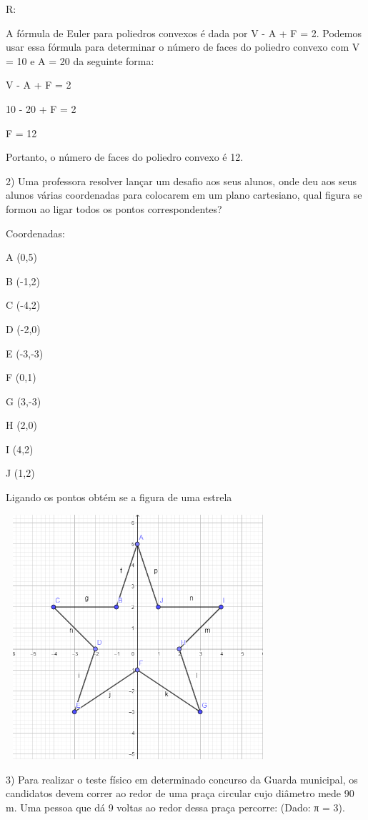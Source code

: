 R:

A fórmula de Euler para poliedros convexos é dada por V - A + F = 2.
Podemos usar essa fórmula para determinar o número de faces do poliedro
convexo com V = 10 e A = 20 da seguinte forma:

V - A + F = 2

10 - 20 + F = 2

F = 12

Portanto, o número de faces do poliedro convexo é 12.

2) Uma professora resolver lançar um desafio aos seus alunos, onde deu
aos seus alunos várias coordenadas para colocarem em um plano
cartesiano, qual figura se formou ao ligar todos os pontos
correspondentes?

Coordenadas:

A (0,5)

B (-1,2)

C (-4,2)

D (-2,0)

E (-3,-3)

F (0,1)

G (3,-3)

H (2,0)

I (4,2)

J (1,2)

Ligando os pontos obtém se a figura de uma estrela

\includegraphics[width=3.85417in,height=3.56597in]{./imgSAEB_6_MAT/media/image45.png}

3) Para realizar o teste físico em determinado concurso da Guarda
municipal, os candidatos devem correr ao redor de uma praça circular
cujo diâmetro mede 90 m. Uma pessoa que dá 9 voltas ao redor dessa praça
percorre: (Dado: π = 3).

